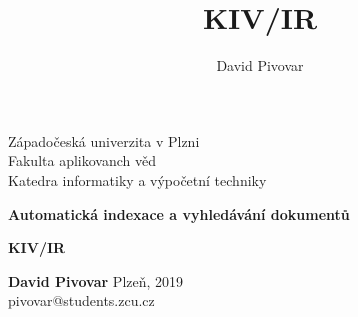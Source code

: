 \documentclass[12pt, a4paper]{report}
\title{KIV/IR}
\author{David Pivovar}
\begin{document}
\begin{titlepage}

\begin{center}
	
	{\fontsize{22}{0} \selectfont
		Západočeská univerzita v Plzni\\
		Fakulta aplikovanch věd\\
		Katedra informatiky a výpočetní techniky\\
	}
	
	\vfill
	\vfill
	\vfill
	
	{\fontsize{28}{0} \textbf{
		Automatická indexace a vyhledávání dokumentů
	}}

	\setlength{\parskip}{1em}
	
	{\fontsize{20}{0} \textbf{
		KIV/IR
	}}

\end{center}

\vfill
\vfill
\vfill
\vfill

\begin{flushleft}

	{\fontsize{16}{0} \selectfont
		
		\textbf{David Pivovar}
		\hfill Plzeň, 2019\\
		
		pivovar@students.zcu.cz
	}
	
\end{flushleft}

\end{titlepage}


\tableofcontents




\end{document}
